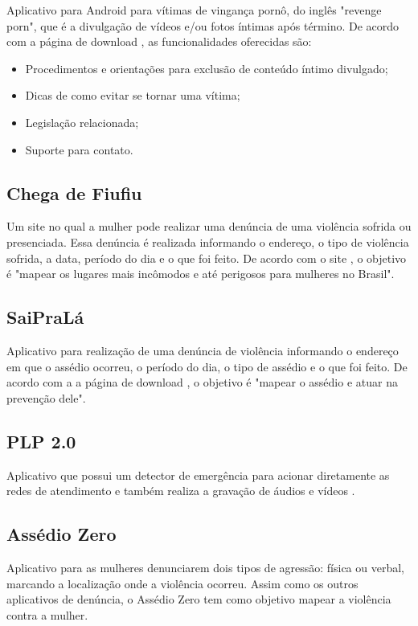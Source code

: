 Aplicativo para Android para vítimas de vingança pornô, do inglês "revenge porn", que é a 
divulgação de vídeos e/ou fotos íntimas após término.
De acordo com a página de download \cite{vazow}, as funcionalidades oferecidas são:

\begin{itemize}
	\item Procedimentos e orientações para exclusão de conteúdo íntimo divulgado;
	\item Dicas de como evitar se tornar uma vítima;
	\item Legislação relacionada;
	\item Suporte para contato.
\end{itemize}

\subsection*{Chega de Fiufiu}

Um site no qual a mulher pode realizar uma denúncia de uma violência sofrida ou presenciada. 
Essa denúncia é realizada informando o endereço, o tipo de violência sofrida, a data, período do dia e o que foi feito. 
De acordo com o site \cite{chegadefiufiu}, o objetivo é "mapear 
os lugares mais incômodos e até perigosos para mulheres no Brasil".

\subsection*{SaiPraLá}

Aplicativo para realização de uma denúncia de violência informando o endereço em que o assédio ocorreu, 
o período do dia, o tipo de assédio e o que foi feito. 
De acordo com a a página de download \cite{saiprala}, o objetivo é "mapear o assédio e atuar na prevenção dele".

\subsection*{PLP 2.0}
Aplicativo que possui um detector de emergência para acionar diretamente as redes de atendimento 
e também realiza a gravação de áudios e vídeos \cite{plp}.

\subsection*{Assédio Zero}

Aplicativo para as mulheres denunciarem dois tipos de agressão: física ou verbal, marcando a localização 
onde a violência ocorreu. Assim como os outros aplicativos de denúncia, o Assédio Zero \cite{assediozero}
tem como objetivo mapear a violência contra a mulher.

